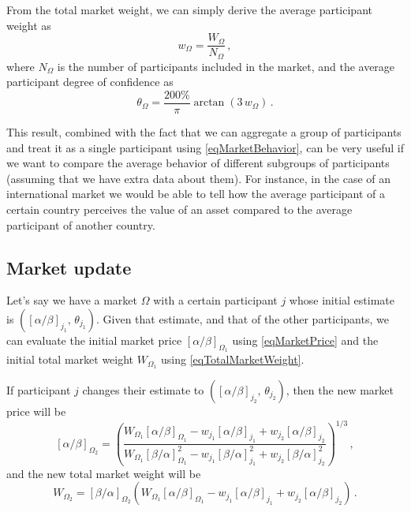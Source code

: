 \documentclass[letterpaper]{article}
\newcommand{\priceAB}{\left[\alpha / \beta\right]}
\newcommand{\priceBA}{\left[\beta / \alpha\right]}
\begin{document}
From the total market weight, we can simply derive the average participant weight as
\begin{equation}
    w_\Omega = \frac{W_\Omega}{N_\Omega} \,, \label{eqAverageParticipantWeight}
\end{equation}
where $N_\Omega$ is the number of participants included in the market, and the average participant degree of confidence as
\begin{equation}
    \theta_\Omega = \frac{200\%}{\pi} \arctan \left( 3 \, w_\Omega\right) \,. \label{eqAvergageParticipantDegree}
\end{equation}

This result, combined with the fact that we can aggregate a group of participants and treat it as a single participant using \eqref{eqMarketBehavior}, can be very useful if we want to compare the average behavior of different subgroups of participants (assuming that we have extra data about them). For instance, in the case of an international market we would be able to tell how the average participant of a certain country perceives the value of an asset compared to the average participant of another country.


\subsection{Market update}\label{secMarketUpdate}

Let's say we have a market $\Omega$ with a certain participant $j$ whose initial estimate is $(\priceAB_{j_1},\, \theta_{j_1})$. Given that estimate, and that of the other participants, we can evaluate the initial market price $\priceAB_{\Omega_1}$ using \eqref{eqMarketPrice} and the initial total market weight $W_{\Omega_1}$ using \eqref{eqTotalMarketWeight}.

If participant $j$ changes their estimate to $(\priceAB_{j_2},\, \theta_{j_2})$, then the new market price will be
\begin{equation}
    \priceAB_{\Omega_2} = \left( \frac{W_{\Omega_1}\priceAB_{\Omega_1} - w_{j_1} \priceAB_{j_1} + w_{j_2} \priceAB_{j_2}}{W_{\Omega_1} \priceBA_{\Omega_1}^2 - w_{j_1}\priceBA_{j_1}^2 + w_{j_2}\priceBA_{j_2}^2}\right)^{1/3} \, ,
\end{equation}
and the new total market weight will be
\begin{equation}
    W_{\Omega_2} = \priceBA_{\Omega_2} \left( W_{\Omega_1}\priceAB_{\Omega_1} - w_{j_1} \priceAB_{j_1} + w_{j_2} \priceAB_{j_2} \right) \, .
\end{equation}
\end{document}
